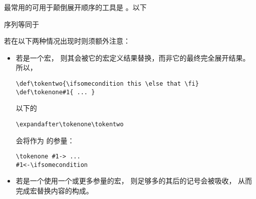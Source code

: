 \documentclass{book}
\begin{document}
最常用的可用于颠倒展开顺序的工具是
。以下
\begin{disp}\end{disp}
序列等同于
\begin{disp}
\end{disp}
若在以下两种情况出现时则须额外注意：
\begin{itemize} \item 若是一个宏，
则其会被它的宏定义结果替换，而非它的最终完全展开结果。所以，
\begin{verbatim}
\def\tokentwo{\ifsomecondition this \else that \fi}
\def\tokenone#1{ ... }
\end{verbatim}
以下的
\begin{verbatim}
\expandafter\tokenone\tokentwo
\end{verbatim}
会将作为
的参量：
\begin{verbatim}
\tokenone #1-> ...
#1<-\ifsomecondition
\end{verbatim}
\item 若是一个使用一个或更多参量的宏，
则足够多的其后的记号会被吸收，
从而完成宏替换内容的构成。
\end{itemize}
\end{document}
